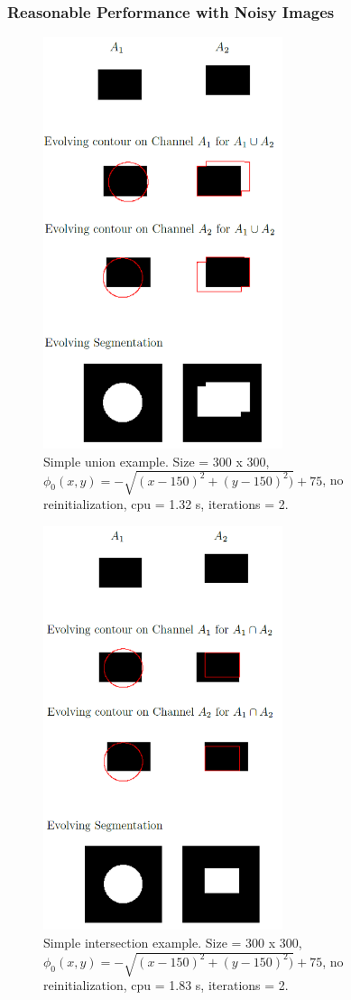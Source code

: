 \documentclass[10pt,twocolumn,letterpaper]{article}
\begin{document}
\subsubsection*{Reasonable Performance with Noisy Images}

\begin{figure}[t]
\centering
\includegraphics[width=7cm]{sc_unionsimple.png}
\caption{Simple union example. Size = 300 x 300, $\phi_{0}(x,y) = - \sqrt{(x - 150)^2 + (y - 150)^2)} + 75$,  no reinitialization, cpu = 1.32 s, 
iterations = 2.}
\label{fig:sc_unionsimple}
\end{figure}

\begin{figure}[t]
\centering
\includegraphics[width=7cm]{sc_intersectionsimple.png}
\caption{Simple intersection example. Size = 300 x 300, $\phi_{0}(x,y) = - \sqrt{(x - 150)^2 + (y - 150)^2)} + 75$,  no reinitialization, cpu = 1.83 s, 
iterations = 2.}
\label{fig:sc_intersectionsimple}
\end{figure}
\end{document}
